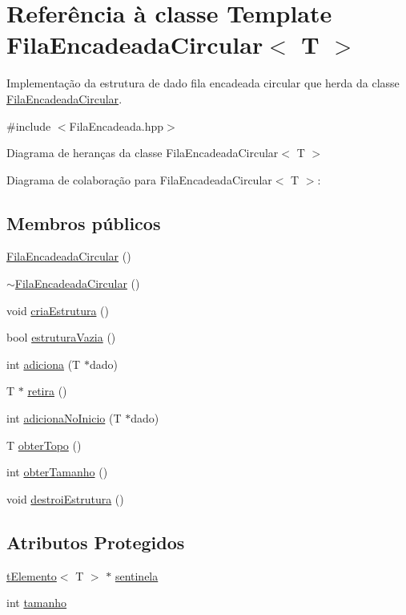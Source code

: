 \hypertarget{a00003}{\section{Referência à classe Template Fila\+Encadeada\+Circular$<$ T $>$}
\label{a00003}
}


Implementação da estrutura de dado fila encadeada circular que herda da classe \hyperlink{a00003}{Fila\+Encadeada\+Circular}.  




{\ttfamily \#include $<$Fila\+Encadeada.\+hpp$>$}



Diagrama de heranças da classe Fila\+Encadeada\+Circular$<$ T $>$


Diagrama de colaboração para Fila\+Encadeada\+Circular$<$ T $>$\+:
\subsection*{Membros públicos}
\begin{DoxyCompactItemize}
\item 
\hyperlink{a00003_abc8c9843469e21051da2301482607eee}{Fila\+Encadeada\+Circular} ()
\item 
\hyperlink{a00003_af0fc66d6ac033bbeed34e605f2aac6f7}{$\sim$\+Fila\+Encadeada\+Circular} ()
\item 
void \hyperlink{a00003_a7cf9350910752a11791a8c11d9f9db6b}{cria\+Estrutura} ()
\item 
bool \hyperlink{a00003_ae3672f48a1ba222f8b763ffdf23b7a28}{estrutura\+Vazia} ()
\item 
int \hyperlink{a00003_a5be1b9cba51f2a0e56ff28cac6ccf95c}{adiciona} (T $\ast$dado)
\item 
T $\ast$ \hyperlink{a00003_a6d92caf9954566984c82317355f1cfea}{retira} ()
\item 
int \hyperlink{a00003_ac8cfb69ffbb7928b635602f323f558ce}{adiciona\+No\+Inicio} (T $\ast$dado)
\item 
T \hyperlink{a00003_a453f5226938097c020a82f24522886e1}{obter\+Topo} ()
\item 
int \hyperlink{a00003_ae58955bcc5f4d14d1f55a40cf39471ec}{obter\+Tamanho} ()
\item 
void \hyperlink{a00003_a9639a74b8534ea1a7c635fa23a9cf284}{destroi\+Estrutura} ()
\end{DoxyCompactItemize}
\subsection*{Atributos Protegidos}
\begin{DoxyCompactItemize}
\item 
\hyperlink{a00006}{t\+Elemento}$<$ T $>$ $\ast$ \hyperlink{a00003_a4286760de29b4691846e8fef53459f33}{sentinela}
\item 
int \hyperlink{a00003_a681be4fb4159df86faab4421fcacb099}{tamanho}
\end{DoxyCompactItemize}


